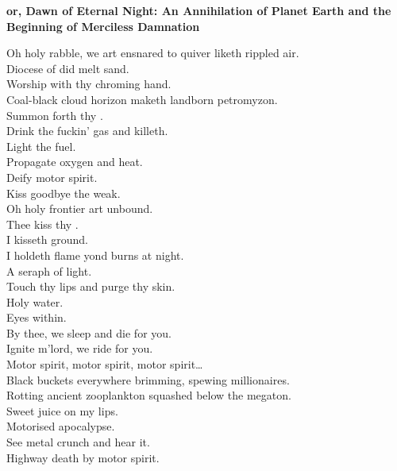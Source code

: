 
\vspace*{-.5\baselineskip}%
\textbf{or, Dawn of Eternal Night: An Annihilation of Planet Earth and the Beginning of Merciless Damnation}

\label{album:petrodragonic-apocalypse}



Oh holy rabble, we art ensnared to quiver liketh rippled air. \\
Diocese of did melt sand. \\
Worship with thy chroming hand. \\
Coal-black cloud horizon maketh landborn petromyzon. \\
Summon forth thy . \\
Drink the fuckin' gas and killeth. \\

Light the fuel. \\
Propagate oxygen and heat. \\
Deify motor spirit. \\
Kiss goodbye the weak. \\

Oh holy frontier art unbound. \\
Thee kiss thy . \\
I kisseth ground. \\
I holdeth flame yond burns at night. \\
A seraph of  light. \\
Touch thy lips and purge thy skin. \\
Holy water. \\
Eyes within. \\
By thee, we sleep and die for you. \\
Ignite m'lord, we ride for you. \\

Motor spirit, motor spirit, motor spirit… \\

Black buckets everywhere brimming, spewing millionaires. \\
Rotting ancient zooplankton squashed below the megaton. \\
Sweet juice on my lips. \\
Motorised apocalypse. \\
See metal crunch and hear it. \\
Highway death by motor spirit. \\

